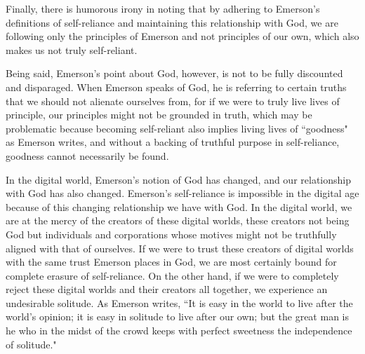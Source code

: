 \documentclass[12pt,letterpaper]{article}
\newif\ifdraft
\begin{document}
Finally, there is humorous irony in noting that by adhering to Emerson's definitions of self-reliance and maintaining this relationship with God, we are following only the principles of Emerson and not principles of our own, which also makes us not truly self-reliant.

Being said, Emerson's point about God, however, is not to be fully discounted and disparaged.  When Emerson speaks of God, he is referring to certain truths that we should not alienate ourselves from, for if we were to truly live lives of principle, our principles might not be grounded in truth, which may be problematic because becoming self-reliant also implies living lives of ``goodness" as Emerson writes, and without a backing of truthful purpose in self-reliance, goodness cannot necessarily be found.
 
 In the digital world, Emerson's notion of God has changed, and our relationship with God has also changed.  Emerson's self-reliance is impossible in the digital age because of this changing relationship we have with God.  In the digital world, we are at the mercy of the creators of these digital worlds, these creators not being God but individuals and corporations whose motives might not be truthfully aligned with that of ourselves.  If we were to trust these creators of digital worlds with the same trust Emerson places in God, we are most certainly bound for complete erasure of self-reliance.  On the other hand, if we were to completely reject these digital worlds and their creators all together, we experience an undesirable solitude.  As Emerson writes, ``It is easy in the world to live after the world’s opinion; it is easy in solitude to live after our own; but the great man is he who in the midst of the crowd keeps with perfect sweetness the independence of solitude."
 
 
 
\ifdraft

When we treat the creators of the digital world with such venerance, we lose hat 


While self-reliance has been shown to be important in the digital world, Emerson's self-reliance can be seen to be overtly extreme.   

Emerson makes no mention about how 

Finally, by participating in these digital worlds, we taking on a new layer of identity, compromising original principles by further following more rules of the digital world and isolating ourselves from a real human identity.  The principles we follow in this digital world will at best be where nothing real is at stake to give certain principles a distinctive triumph, undeterred by qualities afflicting the everyday soul and at worst be the draining of all too many lives who have never achieved self-reliance.
\fi
\end{document}
